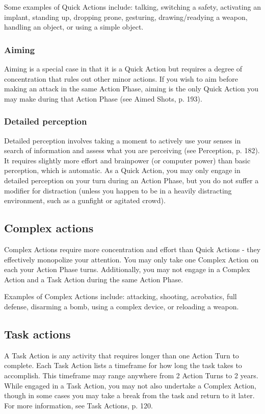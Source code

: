 Some examples of Quick Actions include: talking, switching a safety, activating an implant, standing up, dropping prone, gesturing, drawing/readying a weapon, handling an object, or using a simple object.


\subsubsection{Aiming} Aiming is a special case in that it is a Quick Action but requires a degree of concentration that rules out other minor actions. If you wish to aim before making an attack in the same Action Phase, aiming is the only Quick Action you may make during that Action Phase (see Aimed Shots, p. 193).

\subsubsection{Detailed perception} Detailed perception involves taking a moment to actively use your senses in search of information and assess what you are perceiving (see Perception, p. 182). It requires slightly more effort and brainpower (or computer power) than basic perception, which is automatic. As a Quick Action, you may only engage in detailed perception on your turn during an Action Phase, but you do not suffer a modifier for distraction (unless you happen to be in a heavily distracting environment, such as a gunfight or agitated crowd).


\subsection{Complex actions}
\label{sec:combat-complex-actions}

Complex Actions require more concentration and effort than Quick Actions - they effectively monopolize your attention. You may only take one Complex Action on each your Action Phase turns. Additionally, you may not engage in a Complex Action and a Task Action during the same Action Phase.

Examples of Complex Actions include: attacking, shooting, acrobatics, full defense, disarming a bomb, using a complex device, or reloading a weapon.


\subsection{Task actions}
\label{sec:combat-task-actions}

A Task Action is any activity that requires longer than one Action Turn to complete. Each Task Action lists a timeframe for how long the task takes to accomplish. This timeframe may range anywhere from 2 Action Turns to 2 years. While engaged in a Task Action, you may not also undertake a Complex Action, though in some cases you may take a break from the task and return to it later. For more information, see Task Actions, p. 120.


